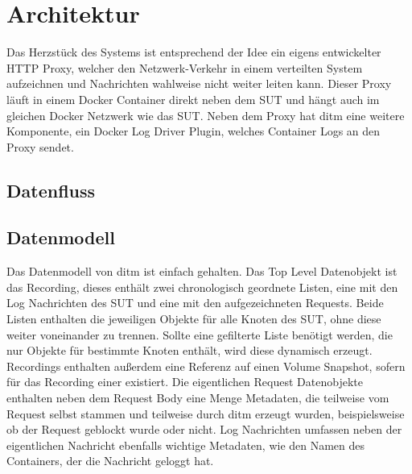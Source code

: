 \documentclass[a4paper]{report}
\begin{document}
\section{Architektur}
Das Herzstück des Systems ist entsprechend der Idee ein eigens entwickelter HTTP Proxy, welcher den Netzwerk-Verkehr in
einem verteilten System aufzeichnen und Nachrichten wahlweise nicht weiter leiten kann. Dieser Proxy läuft in einem
Docker Container direkt neben dem SUT und hängt auch im gleichen Docker Netzwerk wie das SUT. Neben dem Proxy hat
ditm eine weitere Komponente, ein Docker Log Driver Plugin, welches Container Logs an den Proxy sendet.
\subsection{Datenfluss}

\subsection{Datenmodell}
Das Datenmodell von ditm ist einfach gehalten. Das Top Level Datenobjekt ist das Recording, dieses enthält zwei chronologisch
geordnete Listen, eine mit den Log Nachrichten des SUT und eine mit den aufgezeichneten Requests. Beide Listen enthalten
die jeweiligen Objekte für alle Knoten des SUT, ohne diese weiter voneinander zu trennen. Sollte eine gefilterte Liste
benötigt werden, die nur Objekte für bestimmte Knoten enthält, wird diese dynamisch erzeugt. Recordings enthalten außerdem
eine Referenz auf einen Volume Snapshot, sofern für das Recording einer existiert.
Die eigentlichen Request Datenobjekte enthalten neben dem Request Body eine Menge Metadaten, die teilweise vom Request selbst
stammen und teilweise durch ditm erzeugt wurden, beispielsweise ob der Request geblockt wurde oder nicht.
Log Nachrichten umfassen neben der eigentlichen Nachricht ebenfalls wichtige Metadaten, wie den Namen des Containers, der die
Nachricht geloggt hat.
\end{document}
